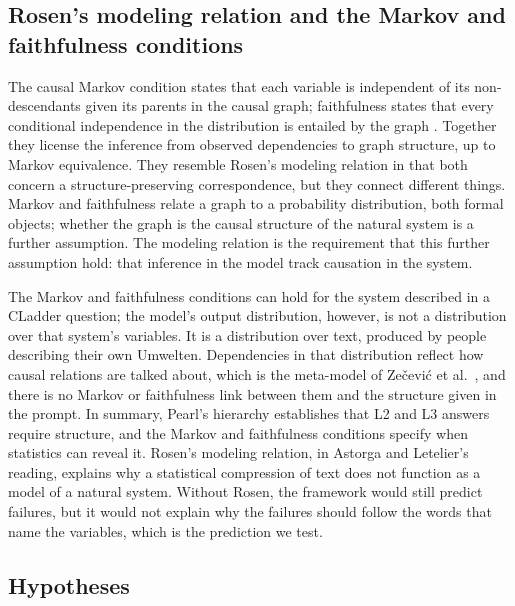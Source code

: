 \documentclass{llncs}
\begin{document}
\subsection{Rosen's modeling relation and the Markov and faithfulness conditions}
\label{sec:markov}

The causal Markov condition states that each variable is independent of its non-descendants given its parents in the causal graph; faithfulness states that every conditional independence in the distribution is entailed by the graph \cite{spirtes2000causation}. Together they license the inference from observed dependencies to graph structure, up to Markov equivalence. They resemble Rosen's modeling relation in that both concern a structure-preserving correspondence, but they connect different things. Markov and faithfulness relate a graph to a probability distribution, both formal objects; whether the graph is the causal structure of the natural system is a further assumption. The modeling relation is the requirement that this further assumption hold: that inference in the model track causation in the system.

The Markov and faithfulness conditions can hold for the system described in a CLadder question; the model's output distribution, however, is not a distribution over that system's variables. It is a distribution over text, produced by people describing their own Umwelten. Dependencies in that distribution reflect how causal relations are talked about, which is the meta-model of Zečević et al.\ \cite{Zecevic2023CausalPL}, and there is no Markov or faithfulness link between them and the structure given in the prompt. In summary, Pearl's hierarchy establishes that L2 and L3 answers require structure, and the Markov and faithfulness conditions specify when statistics can reveal it. Rosen's modeling relation, in Astorga and Letelier's reading, explains why a statistical compression of text does not function as a model of a natural system. Without Rosen, the framework would still predict failures, but it would not explain why the failures should follow the words that name the variables, which is the prediction we test.


\subsection{Hypotheses}
\label{sec:predictions}
\end{document}
